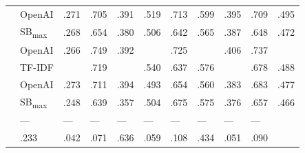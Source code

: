 \begin{table}
\begin{tabularx}{\columnwidth}{@{}llZZZZZZZZZ@{}}
\hline{}
 & OpenAI & .271 & .705 & .391 & .519 & .713 & .599 & .395 & .709 & .495 \\
 & SB\textsubscript{max} & .268 & .654 & .380 & .506 & .642 & .565 & .387 & .648 & .472 \\
\hline{}
 & OpenAI & .266 & .749 & .392 &  & .725 &  & .406 & .737 &  \\
 & TF-IDF &  & .719 &  & .540 & .637 & .576 &  & .678 & .488 \\
\hline{}
 & OpenAI & .273 & .711 & .394 & .493 & .654 & .560 & .383 & .683 & .477 \\
 & SB\textsubscript{max} & .248 & .639 & .357 & .504 & .675 & .575 & .376 & .657 & .466 \\


\hline{}
  & --- & --- & --- & --- & --- & --- & --- & --- & ---  \\
\hline{}
  & .233 & .042 & .071 & .636 & .059 & .108 & .434 & .051 & .090 \\



        \bottomrule
    \end{tabularx}
\end{table}
